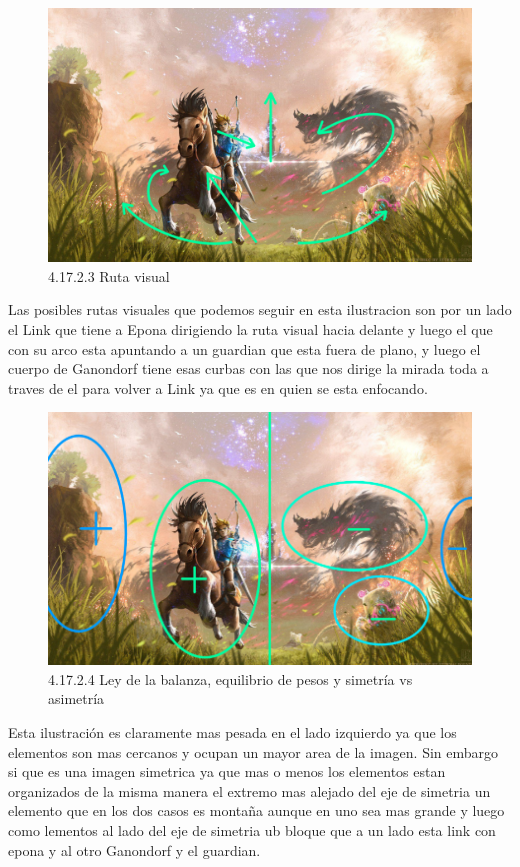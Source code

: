 \documentclass[12pt]{article}
\begin{document}
      \begin{figure}[H]
        \centering
        \includegraphics[width=\textwidth]{images/Saúl/Sección 17/EA_img17_2Composicion_3RutaVisual.png}
        \caption{\small 4.17.2.3 Ruta visual}
      \end{figure}
      Las posibles rutas visuales que podemos seguir en esta ilustracion son por un lado el Link que tiene a Epona dirigiendo la ruta visual hacia delante y luego el que con su arco esta apuntando a un guardian que esta fuera de plano, y luego el cuerpo de Ganondorf tiene esas curbas con las que nos dirige la mirada toda a traves de el para volver a Link ya que es en quien se esta enfocando.


      \begin{figure}[H]
        \centering
        \includegraphics[width=\textwidth]{images/Saúl/Sección 17/EA_img17_2Composicion_4LeyBalanza-Simetria.png}
        \caption{\small 4.17.2.4 Ley de la balanza, equilibrio de pesos y simetría vs asimetría}
      \end{figure}
      Esta ilustración es claramente mas pesada en el lado izquierdo ya que los elementos son mas cercanos y ocupan un mayor area de la imagen. Sin embargo si que es una imagen simetrica ya que mas o menos los elementos estan organizados de la misma manera el extremo mas alejado del eje de simetria un elemento que en los dos casos es montaña aunque en uno sea mas grande y luego como lementos al lado del eje de simetria ub bloque que a un lado esta link con epona y al otro Ganondorf y el guardian.
\end{document}
